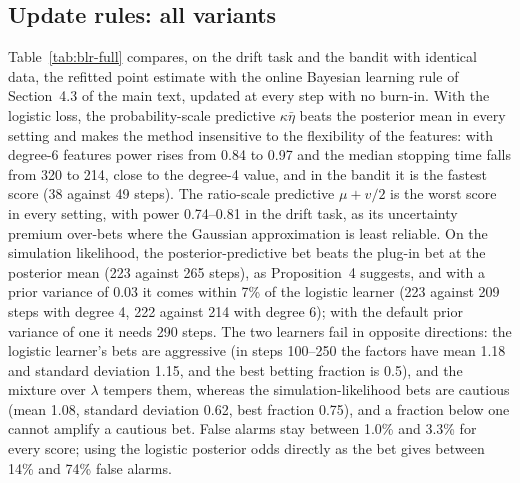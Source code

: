 \documentclass[11pt]{article}
\theoremstyle{remark}
\begin{document}
\subsection{Update rules: all variants}


Table~\ref{tab:blr-full} compares, on the drift task and the bandit with identical
data, the refitted point estimate with the online Bayesian learning rule of
Section~4.3 of the main text, updated at every step with no burn-in. With the
logistic loss, the probability-scale predictive $\kappa\bar\eta$ beats the posterior
mean in every setting and makes the method insensitive to the flexibility of
the features: with degree-6 features power rises from 0.84 to 0.97 and the
median stopping time falls from 320 to 214, close to the degree-4 value, and in
the bandit it is the fastest score (38 against 49 steps). The ratio-scale
predictive $\mu + v/2$ is the worst score in every setting, with power 0.74--0.81
in the drift task, as its uncertainty premium over-bets where the Gaussian
approximation is least reliable. On the simulation likelihood, the
posterior-predictive bet beats the plug-in bet at the posterior mean (223
against 265 steps), as Proposition~4 suggests, and with a prior
variance of 0.03 it comes within 7\% of the logistic learner (223 against 209
steps with degree 4, 222 against 214 with degree 6); with the default prior
variance of one it needs 290 steps. The two learners fail in opposite
directions: the logistic learner's bets are aggressive (in steps 100--250 the
factors have mean 1.18 and standard deviation 1.15, and the best betting
fraction is 0.5), and the mixture over $\lambda$ tempers them, whereas the
simulation-likelihood bets are cautious (mean 1.08, standard deviation 0.62,
best fraction 0.75), and a fraction below one cannot amplify a cautious bet.
False alarms stay between 1.0\% and 3.3\% for every score; using the logistic
posterior odds directly as the bet gives between 14\% and 74\% false alarms.
\end{document}
